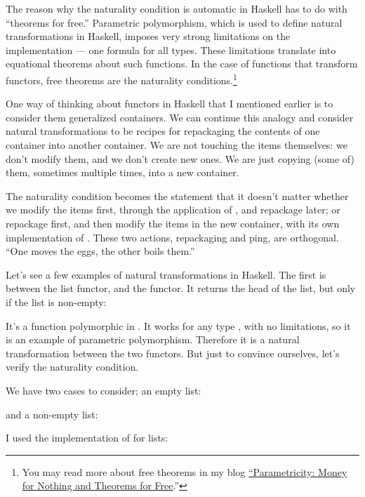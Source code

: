 The reason why the naturality condition is automatic in Haskell has to
do with ``theorems for free.'' Parametric polymorphism, which is used to
define natural transformations in Haskell, imposes very strong
limitations on the implementation --- one formula for all types. These
limitations translate into equational theorems about such functions. In
the case of functions that transform functors, free theorems are the
naturality conditions.\footnote{
  You may read more about free theorems in my
  blog \href{https://bartoszmilewski.com/2014/09/22/parametricity-money-for-nothing-and-theorems-for-free/}{``Parametricity:
    Money for Nothing and Theorems for Free}.''}

One way of thinking about functors in Haskell that I mentioned earlier
is to consider them generalized containers. We can continue this analogy
and consider natural transformations to be recipes for repackaging the
contents of one container into another container. We are not touching
the items themselves: we don't modify them, and we don't create new
ones. We are just copying (some of) them, sometimes multiple times, into
a new container.

The naturality condition becomes the statement that it doesn't matter
whether we modify the items first, through the application of
, and repackage later; or repackage first, and then modify
the items in the new container, with its own implementation of
. These two actions, repackaging and ping, are
orthogonal. ``One moves the eggs, the other boils them.''

Let's see a few examples of natural transformations in Haskell. The
first is between the list functor, and the  functor. It
returns the head of the list, but only if the list is non-empty:

It's a function polymorphic in . It works for any type
, with no limitations, so it is an example of parametric
polymorphism. Therefore it is a natural transformation between the two
functors. But just to convince ourselves, let's verify the naturality
condition.

We have two cases to consider; an empty list:


and a non-empty list:


I used the implementation of  for lists:

